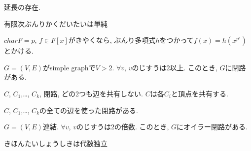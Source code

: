\begin{prop}
  延長の存在.
\end{prop}

\begin{prop}
  有限次ぶんりかくだいたいは単純
\end{prop}

\begin{prop}
  $char F=p$, $f\in F[x]$がきやくなら,
  ぶんり多項式$h$をつかって$f(x)=h(x^{p^e})$とかける.
\end{prop}



\begin{prop}
  $G=(V,E)$がsimple graphで$V>2$.
  $\forall v$, $v$のじすうは2以上.
  このとき, $G$に閉路がある.
\end{prop}

\begin{prop}
  $C$, $C_1$,\ldots, $C_k$, 閉路, どの2つも辺を共有しない.
  $C$は各$C_i$と頂点を共有する.

  $C$, $C_1$,\ldots, $C_k$の全ての辺を使った閉路がある.
\end{prop}


\begin{prop}
  $G=(V,E)$連結.
  $\forall v$, $v$のじすうは2の倍数.
  このとき, $G$にオイラー閉路がある.
\end{prop}



\begin{prop}
きほんたいしょうしきは代数独立
\end{prop}
